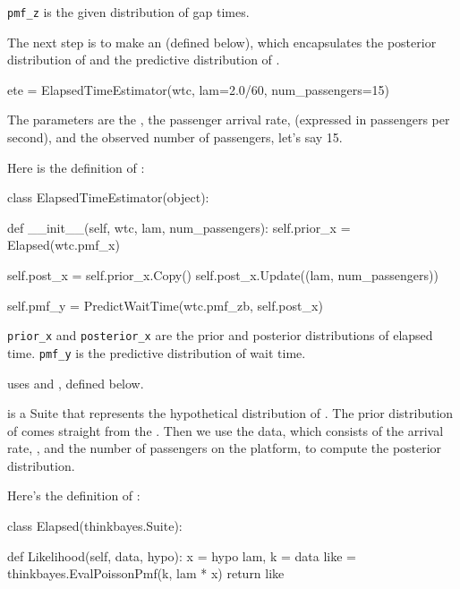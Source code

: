 \documentclass[12pt]{book}
\theoremstyle{exercise}
\begin{document}
\verb"pmf_z" is the given distribution of gap times.

The next step is to make an  (defined
below), which encapsulates the posterior distribution of  and
the predictive distribution of .

\begin{code}
    ete = ElapsedTimeEstimator(wtc,
                               lam=2.0/60,
                               num_passengers=15)
\end{code}

The parameters are the , the passenger
arrival rate,  (expressed in passengers per second),
and the observed number of passengers, let's say 15.

Here is the definition of :

\begin{code}
class ElapsedTimeEstimator(object):

    def __init__(self, wtc, lam, num_passengers):
        self.prior_x = Elapsed(wtc.pmf_x)

        self.post_x = self.prior_x.Copy()
        self.post_x.Update((lam, num_passengers))

        self.pmf_y = PredictWaitTime(wtc.pmf_zb, self.post_x)
\end{code}

\verb"prior_x" and \verb"posterior_x" are the prior and
posterior distributions of elapsed time.  \verb"pmf_y" is
the predictive distribution of wait time.

 uses  and ,
defined below.

 is a Suite that represents the hypothetical
distribution of .  The prior distribution of 
comes straight from the .  Then we
use the data, which consists of the arrival rate, ,
and the number of passengers on the platform, to compute
the posterior distribution.

Here's the definition of :

\begin{code}
class Elapsed(thinkbayes.Suite):

    def Likelihood(self, data, hypo):
        x = hypo
        lam, k = data
        like = thinkbayes.EvalPoissonPmf(k, lam * x)
        return like
\end{code}
\end{document}
